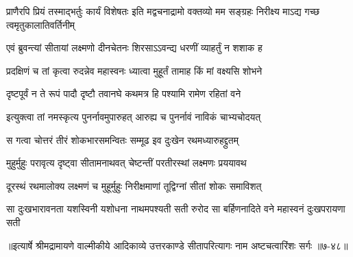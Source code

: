 \threelineshloka
{प्राणैरपि प्रियं तस्माद्भर्तुः कार्यं विशेषतः}
{इति मद्वचनाद्रामो वक्तव्यो मम सङ्ग्रहः}
{निरीक्ष्य माऽद्य गच्छ त्वमृतुकालातिवर्तिनीम्} %

\twolineshloka
{एवं ब्रुवन्त्यां सीतायां लक्ष्मणो दीनचेतनः}
{शिरसाऽऽवन्द्य धरणीं व्याहर्तुं न शशाक ह} %

\twolineshloka
{प्रदक्षिणं च तां कृत्वा रुदन्नेव महास्वनः}
{ध्यात्वा मुहूर्तं तामाह किं मां वक्ष्यसि शोभने} %

\twolineshloka
{दृष्टपूर्वं न ते रूपं पादौ दृष्टौ तवानघे}
{कथमत्र हि पश्यामि रामेण रहितां वने} %

\twolineshloka
{इत्युक्त्वा तां नमस्कृत्य पुनर्नावमुपारुहत्}
{आरुह्य च पुनर्नावं नाविकं चाभ्यचोदयत्} %

\twolineshloka
{स गत्वा चोत्तरं तीरं शोकभारसमन्वितः}
{सम्मूढ इव दुःखेन रथमध्यारुहद्द्रुतम्} %

\twolineshloka
{मुहुर्मुहुः परावृत्य दृष्ट्वा सीतामनाथवत्}
{चेष्टन्तीं परतीरस्थां लक्ष्मणः प्रययावथ} %

\twolineshloka
{दूरस्थं रथमालोक्य लक्ष्मणं च मुहूर्मुहुः}
{निरीक्षमाणां तूद्विग्नां सीतां शोकः समाविशत्} %

\twolineshloka
{सा दुःखभारावनता यशस्विनी यशोधना नाथमपश्यती सती}
{रुरोद सा बर्हिणनादिते वने महास्वनं दुःखपरायणा सती} %


॥इत्यार्षे श्रीमद्रामायणे वाल्मीकीये आदिकाव्ये उत्तरकाण्डे सीतापरित्यागः नाम अष्टचत्वारिंशः सर्गः ॥७-४८॥
